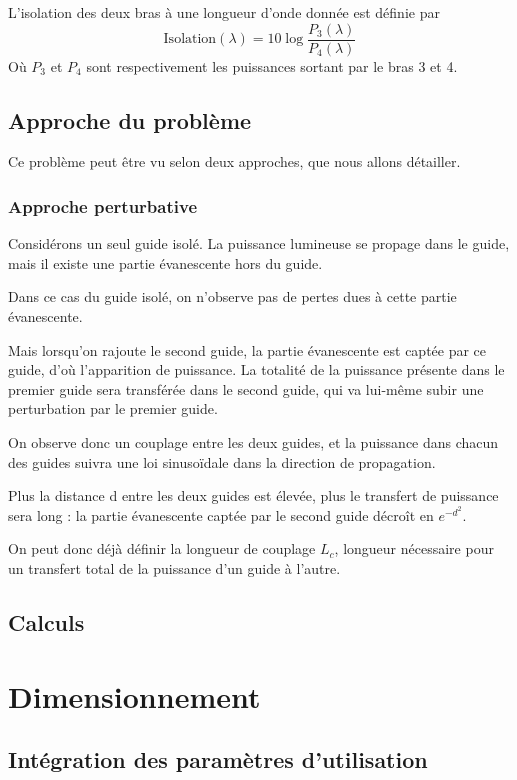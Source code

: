 \documentclass[a4paper,11pt]{report}
\begin{document}
L'isolation des deux bras à une longueur d'onde donnée est définie par
\[\text{Isolation}(\lambda) = 10 \log\frac{P_3(\lambda)}{P_4(\lambda)}
\]
Où $P_3$ et $P_4$ sont respectivement les puissances sortant par le bras 3 et 4.

\section{Approche du problème}
Ce problème peut être vu selon deux approches, que nous allons détailler.
\subsection{Approche perturbative}
Considérons un seul guide isolé. La puissance lumineuse se propage dans le guide, mais il existe une partie évanescente hors du guide.

Dans ce cas du guide isolé, on n'observe pas de pertes dues à cette partie évanescente.

Mais lorsqu'on rajoute le second guide, la partie évanescente est captée par ce guide, d'où l'apparition de puissance. La totalité de la puissance présente dans le premier guide sera transférée dans le second guide, qui va lui-même subir une perturbation par le premier guide.

On observe donc un couplage entre les deux guides, et la puissance dans chacun des guides suivra une loi sinusoïdale dans la direction de propagation.

Plus la distance d entre les deux guides est élevée, plus le transfert de puissance sera long : la partie évanescente captée par le second guide décroît en $e^{-d^2}$.

On peut donc déjà définir la longueur de couplage $L_c$, longueur nécessaire pour un transfert total de la puissance d'un guide à l'autre.






\section{Calculs}%
\chapter{Dimensionnement}
\section{Intégration des paramètres d'utilisation}
\end{document}
